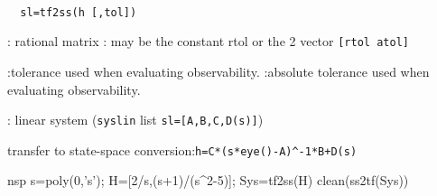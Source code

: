 \begin{mandesc}
   \\ %
\end{mandesc}
\begin{calling_sequence}
\begin{verbatim}
  sl=tf2ss(h [,tol])  
\end{verbatim}
\end{calling_sequence}
\begin{parameters}
  \begin{varlist}
    : rational matrix
    : may be the constant rtol or the 2 vector \verb![rtol atol]!
    \begin{varlist}
      :tolerance used when evaluating observability.
      :absolute tolerance used when evaluating observability.
    \end{varlist}
    : linear system (\verb!syslin! list \verb!sl=[A,B,C,D(s)]!)
  \end{varlist}
\end{parameters}
\begin{mandescription}
  transfer to state-space conversion:\verb!h=C*(s*eye()-A)^-1*B+D(s)!
\end{mandescription}
\begin{examples}
  \begin{mintednsp}{nsp}
    s=poly(0,'s');
    H=[2/s,(s+1)/(s^2-5)];
    Sys=tf2ss(H)
    clean(ss2tf(Sys))
  \end{mintednsp}
\end{examples}
\begin{manseealso}
      
\end{manseealso}
